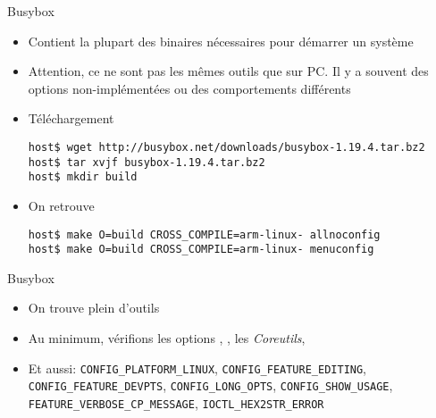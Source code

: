 \begin{frame}[fragile=singleslide]{Busybox}
  \begin{itemize}
  \item  Contient la plupart  des binaires  nécessaires pour  démarrer un
    système
  \item Attention, ce ne  sont pas les mêmes outils que sur  PC. Il y a
    souvent des options non-implémentées ou des comportements différents
  \item Téléchargement
    \begin{lstlisting}
host$ wget http://busybox.net/downloads/busybox-1.19.4.tar.bz2
host$ tar xvjf busybox-1.19.4.tar.bz2
host$ mkdir build
    \end{lstlisting}
  \item On retrouve 
    \begin{lstlisting}
host$ make O=build CROSS_COMPILE=arm-linux- allnoconfig
host$ make O=build CROSS_COMPILE=arm-linux- menuconfig
    \end{lstlisting}
  \end{itemize}
\end{frame}

\begin{frame}[fragile=singleslide]{Busybox}
  \begin{itemize}
  \item On trouve plein d'outils
  \item    Au   minimum,    vérifions les options    ,   ,    les
    \emph{Coreutils},   
  \item         Et         aussi:        \verb+CONFIG_PLATFORM_LINUX+,
    \verb+CONFIG_FEATURE_EDITING+,        \verb+CONFIG_FEATURE_DEVPTS+,
    \verb+CONFIG_LONG_OPTS+,                  \verb+CONFIG_SHOW_USAGE+,
    \verb+FEATURE_VERBOSE_CP_MESSAGE+, \verb+IOCTL_HEX2STR_ERROR+
  \end{itemize}
\end{frame}

